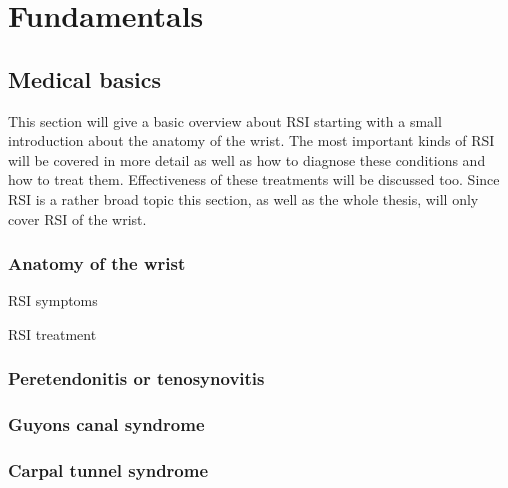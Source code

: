\chapter{Fundamentals}
\label{sec:fundamentals}

\section{Medical basics}

This section will give a basic overview about \gls{RSI} starting with a small introduction about the anatomy of the wrist.
The most important kinds of \gls{RSI} will be covered in more detail as well as how to diagnose these conditions and how to treat them.
Effectiveness of these treatments will be discussed too.
Since \gls{RSI} is a rather broad topic this section, as well as the whole thesis, will only cover \gls{RSI} of the wrist.

\subsection{Anatomy of the wrist}

\gls{RSI} symptoms

\gls{RSI} treatment

\subsection{Peretendonitis or tenosynovitis}

\subsection{Guyons canal syndrome}

\subsection{Carpal tunnel syndrome}

